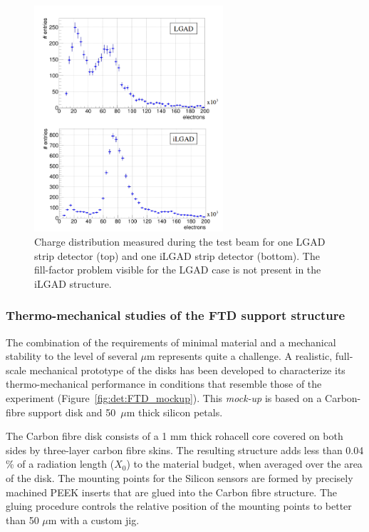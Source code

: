 \begin{figure}[t]
\centering
\includegraphics[width=7cm]{Detector/fig/fill-factor.png}
\caption{Charge distribution measured during the test beam for one LGAD strip detector (top) and one iLGAD strip detector (bottom). The fill-factor problem visible for the LGAD case is not present in the iLGAD structure.} 
\label{fig:det:fill-factor}
\centering
\end{figure}


\subsubsection{Thermo-mechanical studies of the FTD support structure}

The combination of the requirements of minimal material and a mechanical stability to 
the level of several $\mu\mathrm{m}$ represents quite a challenge. A realistic, 
full-scale mechanical prototype of the disks has been developed to characterize 
its thermo-mechanical performance 
in conditions that resemble those of the experiment (Figure~\ref{fig:det:FTD_mockup}). 
This {\em mock-up} is based on a Carbon-fibre support disk
and 50~$\mu\mathrm{m}$ thick silicon petals. 

The Carbon fibre disk consists of
a 1 mm thick rohacell core covered on both sides by three-layer carbon fibre skins. The resulting structure adds less than 0.04 \% of a radiation length ($X_0$) to the material budget, when averaged over the area of the disk. The mounting points for the Silicon sensors are formed by precisely machined 
PEEK inserts that are glued into the Carbon fibre structure. The gluing procedure controls the relative position of the mounting points to better than 50 $\mu \mathrm{m}$ with a custom jig. 

